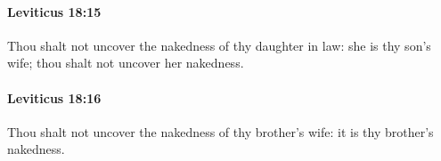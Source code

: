 		\paragraph{Leviticus 18:15} %
			\label{LEVITICUS-18-15}

			Thou shalt not uncover the nakedness of thy daughter in law: she is thy son’s wife; thou shalt not uncover her nakedness.


		\paragraph{Leviticus 18:16} %
			\label{LEVITICUS-18-16}

			Thou shalt not uncover the nakedness of thy brother’s wife: it is thy brother’s nakedness.


